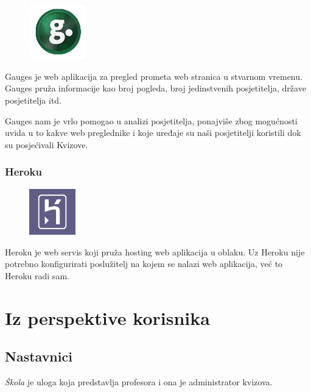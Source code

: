 \documentclass{scrreprt}
\begin{document}
\begin{figure}
  \vspace{-10pt}
  \includegraphics[width=2.5cm]{logos/gauges}
  \vspace{-30pt}
\end{figure}

Gauges je web aplikacija za pregled prometa web stranica u stvarnom vremenu.
Gauges pruža informacije kao broj pogleda, broj jedinstvenih posjetitelja,
države posjetitelja itd.\cite{gauges}

Gauges nam je vrlo pomogao u analizi posjetitelja, ponajviše zbog mogućnosti
uvida u to kakve web preglednike i koje uređaje su naši posjetitelji koristili
dok su posjećivali Kvizove.

\subsubsection{Heroku}

\begin{figure}
  \vspace{-10pt}
  \includegraphics[width=2cm]{logos/heroku}
  \vspace{-30pt}
\end{figure}

Heroku je web servis koji pruža hosting web aplikacija u oblaku.\cite{heroku}
Uz Heroku nije potrebno konfigurirati poslužitelj na kojem se nalazi web
aplikacija, već to Heroku radi sam.

\section{Iz perspektive korisnika}

\subsection{Nastavnici}

\emph{Škola} je uloga koja predstavlja profesora i ona je administrator kvizova.
\end{document}
